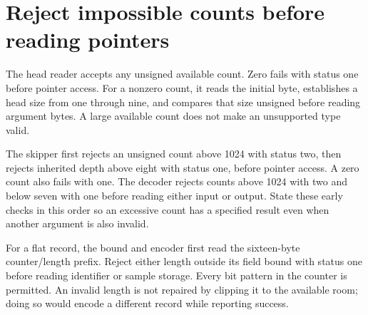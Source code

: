 \section{Reject impossible counts before reading pointers}
The head reader accepts any unsigned available count. Zero fails with status one before
pointer access. For a nonzero count, it reads the initial byte, establishes a head size
from one through nine, and compares that size unsigned before reading argument bytes.
A large available count does not make an unsupported type valid.

The skipper first rejects an unsigned count above 1024 with status two, then rejects
inherited depth above eight with status one, before pointer access. A zero count also
fails with one. The decoder rejects counts above 1024 with two and below seven with
one before reading either input or output. State these early checks in this order so
an excessive count has a specified result even when another argument is also invalid.

For a flat record, the bound and encoder first read the sixteen-byte counter/length
prefix. Reject either length outside its field bound with status one before reading
identifier or sample storage. Every bit pattern in the counter is permitted. An invalid
length is not repaired by clipping it to the available room; doing so would encode a
different record while reporting success.

